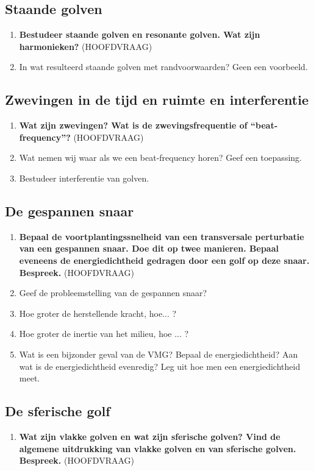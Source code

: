 \documentclass[a4paper,12pt]{article}
\begin{document}
    \subsection{Staande golven}
    \begin{enumerate}
        \item \textbf{Bestudeer staande golven en resonante golven.  Wat zijn harmonieken?} (HOOFDVRAAG)
        \item In wat resulteerd staande golven met randvoorwaarden? Geen een voorbeeld.
    \end{enumerate}
    \subsection{Zwevingen in de tijd en ruimte en interferentie}
    \begin{enumerate}
        \item \textbf{Wat zijn zwevingen? Wat is de zwevingsfrequentie of “beat-frequency”?} (HOOFDVRAAG)
        \item Wat nemen wij waar als we een beat-frequency horen? Geef een toepassing.
        \item Bestudeer interferentie van golven.
    \end{enumerate}
    \subsection{De gespannen snaar}
    \begin{enumerate}
        \item \textbf{Bepaal de voortplantingssnelheid van een transversale perturbatie van een gespannen snaar. Doe dit op twee manieren. Bepaal eveneens de energiedichtheid gedragen door een golf op deze snaar. Bespreek.} (HOOFDVRAAG)
        \item Geef de probleemstelling van de gespannen snaar?
        \item Hoe groter de herstellende kracht, hoe... ?
        \item Hoe groter de inertie van het milieu, hoe ... ?
        \item Wat is een bijzonder geval van de VMG? Bepaal de energiedichtheid? Aan wat is de energiedichtheid evenredig? Leg uit hoe men een energiedichtheid meet.
    \end{enumerate}
    \subsection{De sferische golf}
    \begin{enumerate}
        \item \textbf{Wat zijn vlakke golven en wat zijn sferische golven? Vind de algemene uitdrukking van vlakke golven en van sferische golven. Bespreek.} (HOOFDVRAAG)
    \end{enumerate}
\end{document}
